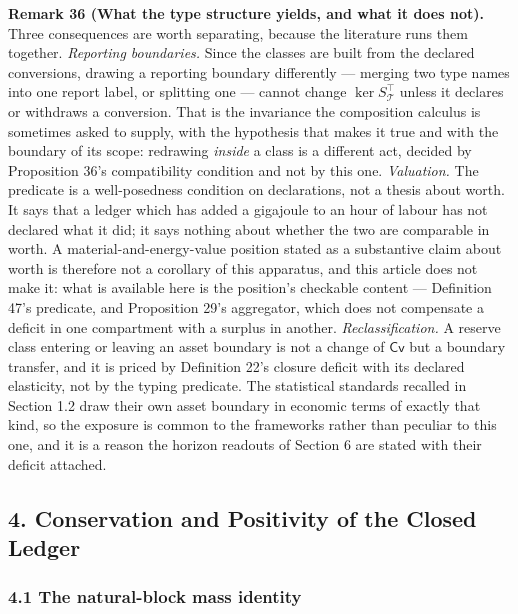 \documentclass[11pt]{article}
\begin{document}
\textbf{Remark 36 (What the type structure yields, and what it does not).} Three consequences are worth separating,
because the literature runs them together. \emph{Reporting boundaries.} Since the classes are built from the
declared conversions, drawing a reporting boundary differently --- merging two type names into one report
label, or splitting one --- cannot change \(\ker S_{\mathcal{T}}^{\top}\) unless it declares or withdraws a
conversion. That is the invariance the composition calculus is sometimes asked to supply, with the hypothesis
that makes it true and with the boundary of its scope: redrawing \emph{inside} a class is a different act, decided
by Proposition 36's compatibility condition and not by this one. \emph{Valuation.} The predicate is a
well-posedness condition on declarations, not a thesis about worth. It says that a ledger which has added a
gigajoule to an hour of labour has not declared what it did; it says nothing about whether the two are
comparable in worth. A material-and-energy-value position stated as a substantive claim about worth is
therefore not a corollary of this apparatus, and this article does not make it: what is available here is the
position's checkable content --- Definition 47's predicate, and Proposition 29's aggregator, which does not
compensate a deficit in one compartment with a surplus in another. \emph{Reclassification.} A reserve class
entering or leaving an asset boundary is not a change of \(\mathsf{Cv}\) but a boundary transfer, and it is
priced by Definition 22's closure deficit with its declared elasticity, not by the typing predicate. The
statistical standards recalled in Section 1.2 draw their own asset boundary in economic terms of exactly that
kind, so the exposure is common to the frameworks rather than peculiar to this one, and it is a reason the
horizon readouts of Section 6 are stated with their deficit attached.



\subsection{4. Conservation and Positivity of the Closed
Ledger}\label{conservation-and-positivity-of-the-closed-ledger}

\subsubsection{4.1 The natural-block mass
identity}\label{the-natural-block-mass-identity}
\end{document}
